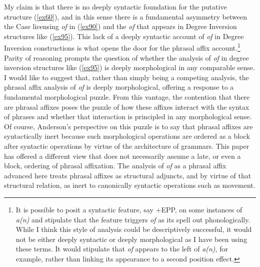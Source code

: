 \documentclass[output=paper,
modfonts
]{LSP/langsci}
\begin{document}
{{{My claim is that there is no deeply syntactic foundation for the putative structure ({\ref{ex60}}), and in this sense there is a fundamental asymmetry between the Case licensing {\textit{of}} in ({\ref{ex90}}) and the {\textit{of}} that appears in Degree Inversion structures like ({\ref{ex95}}).  This lack of a deeply syntactic account of {\textit{of}} in Degree Inversion constructions is what opens the door for the phrasal affix account.{\footnote{It is possible to posit a syntactic feature, say +EPP, on some instances of {\textit{a(n)}} and stipulate that the feature triggers {\textit{of}} as its spell out phonologically.  While I think this style of analysis could be descriptively successful, it would not be either deeply syntactic or deeply morphological as I have been using these terms.  It would stipulate that {\textit{of}} appears to the left of {\textit{a(n)}}, for example, rather than linking its appearance to a second position effect.}} Parity of reasoning prompts the question of whether the analysis of {\textit{of}} in degree inversion structures like ({\ref{ex95}}) is deeply morphological in any comparable sense.  I would like to suggest that, rather than simply being a competing analysis, the phrasal affix analysis of {\textit{of}} is deeply morphological, offering a response to a fundamental morphological puzzle.   From this vantage, the contention that there are phrasal affixes poses the puzzle of how these affixes interact with the syntax of phrases and whether that interaction is principled in any morphological sense. Of course, Anderson's perspective on this puzzle is to say that phrasal affixes are syntactically inert because such morphological operations are ordered as a block after syntactic operations by virtue of the architecture of grammars.  This paper has offered a different view that does not necessarily assume a late, or even a block, ordering of phrasal affixation.  The analysis of {\textit{of}} as a phrasal affix advanced here treats phrasal affixes as structural adjuncts, and by virtue of that structural relation, as inert to canonically syntactic operations such as movement.  

}}}
\end{document}

